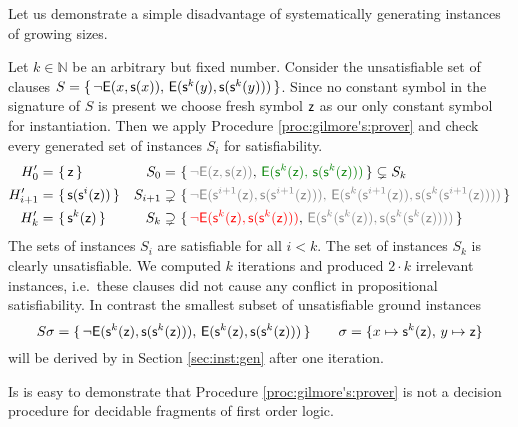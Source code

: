 Let us demonstrate a simple disadvantage of systematically generating instances of growing sizes.

\begin{example}\label{ex:unsat:nexsx}
	Let \( k\in\mathbb{N} \) be an arbitrary but fixed number.
	Consider the unsatisfiable set of clauses
	\(
		S =
		 \{ \,
		{ \lnot\mathsf{E}(x, \mathsf{s}(x)) }, \,
		{ \mathsf{E}(\mathsf{s}^{k}(y), \mathsf{s}(\mathsf{s}^{k}(y)))}
		 \, \}
	 \).
	Since no constant symbol in the signature of \( S \) is present 
	we choose fresh symbol \( \mathsf{z} \) as our only constant symbol for instantiation.
	Then we apply Procedure \ref{proc:gilmore's:prover} 
	and check every generated set of instances \( S_i \) for satisfiability.
	\begin{align*}
	H'_{0} =&{\ } \{ \, \mzero{} \, \}
	&
	S_{0} =&{\ } \{ \,
	{\colG \lnot\mE(\mzero,\msucc(\mzero))}, \,
	{\colHi \mE(\msucc^k(\mzero), \, \msucc(\msucc^k(\mzero)))}
	 \, \}
	\subsetneq S_k
	\\
	H'_{i+1} =&{\ } \{ \, \msucc(\msucc^{i}(\mzero)) \, \}
	&
	S_{i+1} \supsetneq&\
	 \{ \,
	{\colG \lnot\mE(\msucc^{i+1}(\mzero),\msucc(\msucc^{i+1}(\mzero))), \,
		\mE(\msucc^k(\msucc^{i+1}(\mzero)), \msucc(\msucc^k(\msucc^{i+1}(\mzero))))}
	 \, \}
	\\
	H'_{k} =&{\ } \{ \, \msucc^{k}(\mzero) \, \}
	&
	S_{k} \supsetneq&\
	 \{ \,
	{\colLo \lnot\mE(\msucc^{k}(\mzero),\msucc(\msucc^{k}(\mzero)))}, \,
	{\colG\mE(\msucc^k(\msucc^{k}(\mzero)), \msucc(\msucc^k(\msucc^{k}(\mzero))))}
	 \, \}
	\end{align*}
	The sets of instances \( S_{i} \) are satisfiable for all \( i<k \).
	The set of instances \( S_{k} \) is clearly unsatisfiable.
	We computed \(k\) iterations and produced \( 2\cdot k \)
	{ irrelevant} instances,
	i.e.~these clauses did not cause any conflict in
	propositional satisfiability.
	In contrast the smallest subset of unsatisfiable ground instances
	\[
		S\sigma = 
		\{ \,
			{ \lnot\mathsf{E}(\mathsf{s}^k(\mathsf{z}), \mathsf{s}(\mathsf{s}^k(\mathsf{z}))) }, \,
			{ \mathsf{E}(\mathsf{s}^{k}(\mathsf{z}), \mathsf{s}(\mathsf{s}^{k}(\mathsf{z})))}
		 \, \}
		 \qquad \sigma= \{ x\mapsto \mathsf{s}^k(\mathsf{z}), \, y\mapsto \mathsf{z} \}
	\]
	will be derived by \InstGen in Section \vref{sec:inst:gen} after one iteration.
\end{example}

\noindent Is is easy to demonstrate that Procedure 
\vref{proc:gilmore's:prover} is not a decision procedure 
for decidable fragments of first order logic.

